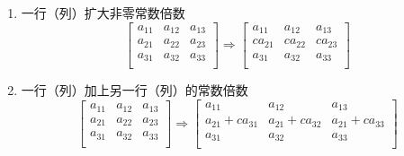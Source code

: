\begin{enumerate}
\item 一行（列）扩大非零常数倍数
\begin{equation}
\left[
    \begin{array}{ccc}
        a_{11} & a_{12} & a_{13}\\
        a_{21} & a_{22} & a_{23}\\
        a_{31} & a_{32} & a_{33}\\
    \end{array}
\right]
\Rightarrow
\left[
    \begin{array}{ccc}
        a_{11} & a_{12} & a_{13}\\
        ca_{21} & ca_{22} & ca_{23}\\
        a_{31} & a_{32} & a_{33}\\
    \end{array}
\right]
\end{equation}
\item 一行（列）加上另一行（列）的常数倍数
\begin{equation}
\left[
    \begin{array}{ccc}
        a_{11} & a_{12} & a_{13}\\
        a_{21} & a_{22} & a_{23}\\
        a_{31} & a_{32} & a_{33}\\
    \end{array}
\right]
\Rightarrow
\left[
    \begin{array}{ccc}
        a_{11} & a_{12} & a_{13}\\
        a_{21}+ca_{31} & a_{21}+ca_{32} & a_{21}+ca_{33}\\
        a_{31} & a_{32} & a_{33}\\
    \end{array}
\right]
\end{equation}
\end{enumerate}

